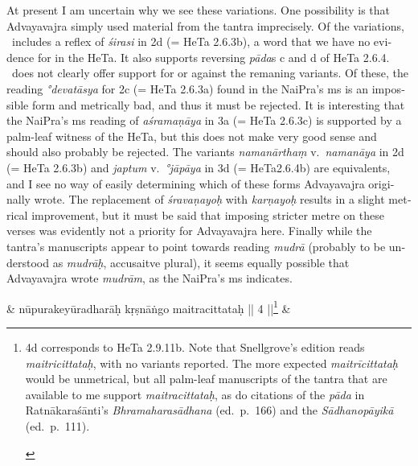 \documentclass[naipra.tex]{subfiles}
\begin{document}
\begin{sanskrit}
{\begin{english}
	At present I am uncertain why we see these variations.
	One possibility is that Advayavajra simply used material from the tantra imprecisely.
	Of the variations, \TIB\ includes a reflex of \emph{śirasi} in 2d (= HeTa 2.6.3b), a word that we have no evidence for in the HeTa.
	It also supports reversing \emph{pāda}s c and d of HeTa 2.6.4.
	\TIB\ does not clearly offer support for or against the remaning variants. 
	Of these, the reading \emph{°devatāsya} for 2c (= HeTa 2.6.3a) found in the NaiPra's ms is an impossible form and metrically bad, and thus it must be rejected.
	It is interesting that the NaiPra's ms reading of \emph{aśramaṇāya} in 3a (= HeTa 2.6.3c) is supported by a palm-leaf witness of the HeTa, but this does not make very good sense and should also probably be rejected.
	The variants \emph{namanārthaṃ} v.\ \emph{namanāya} in 2d (= HeTa 2.6.3b) and \emph{japtum} v.\ \emph{°jāpāya} in 3d (= HeTa2.6.4b) are equivalents, and I see no way of easily determining which of these forms Advayavajra originally wrote.
	The replacement of \emph{śravaṇayoḥ} with \emph{karṇayoḥ} results in a slight metrical improvement, but it must be said that imposing stricter metre on these verses was evidently not a priority for Advayavajra here. 
	Finally while the tantra's manuscripts appear to point towards reading \emph{mudrā} (probably to be understood as \emph{mudrāḥ}, accusaitve plural), it seems equally possible that Advayavajra wrote \emph{mudrām}, as the NaiPra's ms indicates.
\end{english}} &
nūpurakeyūradharāḥ kṛṣnāṅgo maitracittataḥ || 4 ||\footnote{\begin{english}
	4d corresponds to HeTa 2.9.11b.
	Note that Snellgrove's edition reads \emph{maitricittataḥ}, with no variants reported.
	The more expected \emph{maitrīcittataḥ} would be unmetrical, but all palm-leaf manuscripts of the tantra that are available to me support \emph{maitracittataḥ}, as do citations of the \emph{pāda} in Ratnākaraśānti's \emph{Bhramaharasādhana} (ed.\ p.\ 166) and the \emph{Sādhanopāyikā} (ed.\ p.\ 111). 
\end{english}} \&



\end{sanskrit}
\end{document}

